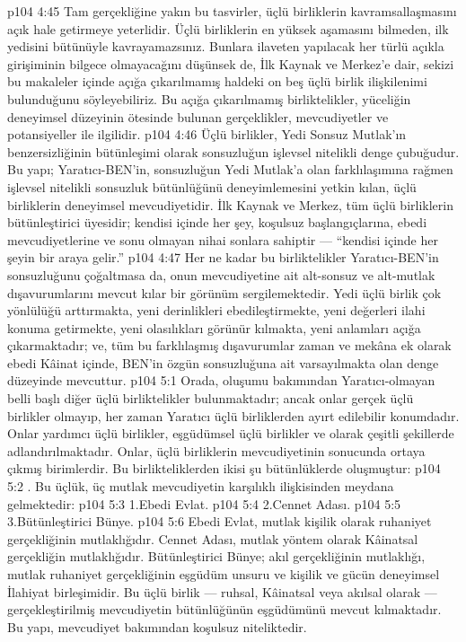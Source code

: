 \vs p104 4:45 Tam gerçekliğine yakın bu tasvirler, üçlü birliklerin kavramsallaşmasını açık hale getirmeye yeterlidir. Üçlü birliklerin en yüksek aşamasını bilmeden, ilk yedisini bütünüyle kavrayamazsınız. Bunlara ilaveten yapılacak her türlü açıkla girişiminin bilgece olmayacağını düşünsek de, İlk Kaynak ve Merkez’e dair, sekizi bu makaleler içinde açığa çıkarılmamış haldeki on beş üçlü birlik ilişkilenimi bulunduğunu söyleyebiliriz. Bu açığa çıkarılmamış birliktelikler, yüceliğin deneyimsel düzeyinin ötesinde bulunan gerçeklikler, mevcudiyetler ve potansiyeller ile ilgilidir.
\vs p104 4:46 Üçlü birlikler, Yedi Sonsuz Mutlak’ın benzersizliğinin bütünleşimi olarak sonsuzluğun işlevsel nitelikli denge çubuğudur. Bu yapı; Yaratıcı\hyp{}BEN’in, sonsuzluğun Yedi Mutlak’a olan farklılaşımına rağmen işlevsel nitelikli sonsuzluk bütünlüğünü deneyimlemesini yetkin kılan, üçlü birliklerin deneyimsel mevcudiyetidir. İlk Kaynak ve Merkez, tüm üçlü birliklerin bütünleştirici üyesidir; kendisi içinde her şey, koşulsuz başlangıçlarına, ebedi mevcudiyetlerine ve sonu olmayan nihai sonlara sahiptir --- “kendisi içinde her şeyin bir araya gelir.”
\vs p104 4:47 Her ne kadar bu birliktelikler Yaratıcı\hyp{}BEN’in sonsuzluğunu çoğaltmasa da, onun mevcudiyetine ait alt\hyp{}sonsuz ve alt\hyp{}mutlak dışavurumlarını mevcut kılar bir görünüm sergilemektedir. Yedi üçlü birlik çok yönlülüğü arttırmakta, yeni derinlikleri ebedileştirmekte, yeni değerleri ilahi konuma getirmekte, yeni olasılıkları görünür kılmakta, yeni anlamları açığa çıkarmaktadır; ve, tüm bu farklılaşmış dışavurumlar zaman ve mekâna ek olarak ebedi Kâinat içinde, BEN’in özgün sonsuzluğuna ait varsayılmakta olan denge düzeyinde mevcuttur.
\vs p104 5:1 Orada, oluşumu bakımından Yaratıcı\hyp{}olmayan belli başlı diğer üçlü birliktelikler bulunmaktadır; ancak onlar gerçek üçlü birlikler olmayıp, her zaman Yaratıcı üçlü birliklerden ayırt edilebilir konumdadır. Onlar yardımcı üçlü birlikler, eşgüdümsel üçlü birlikler ve  olarak çeşitli şekillerde adlandırılmaktadır. Onlar, üçlü birliklerin mevcudiyetinin sonucunda ortaya çıkmış birimlerdir. Bu birlikteliklerden ikisi şu bütünlüklerde oluşmuştur:
\vs p104 5:2 . Bu üçlük, üç mutlak mevcudiyetin karşılıklı ilişkisinden meydana gelmektedir:
\vs p104 5:3 1.\bibnobreakspace Ebedi Evlat.
\vs p104 5:4 2.\bibnobreakspace Cennet Adası.
\vs p104 5:5 3.\bibnobreakspace Bütünleştirici Bünye.
\vs p104 5:6 Ebedi Evlat, mutlak kişilik olarak ruhaniyet gerçekliğinin mutlaklığıdır. Cennet Adası, mutlak yöntem olarak Kâinatsal gerçekliğin mutlaklığıdır. Bütünleştirici Bünye; akıl gerçekliğinin mutlaklığı, mutlak ruhaniyet gerçekliğinin eşgüdüm unsuru ve kişilik ve gücün deneyimsel İlahiyat birleşimidir. Bu üçlü birlik --- ruhsal, Kâinatsal veya akılsal olarak --- gerçekleştirilmiş mevcudiyetin bütünlüğünün eşgüdümünü mevcut kılmaktadır. Bu yapı, mevcudiyet bakımından koşulsuz niteliktedir.

